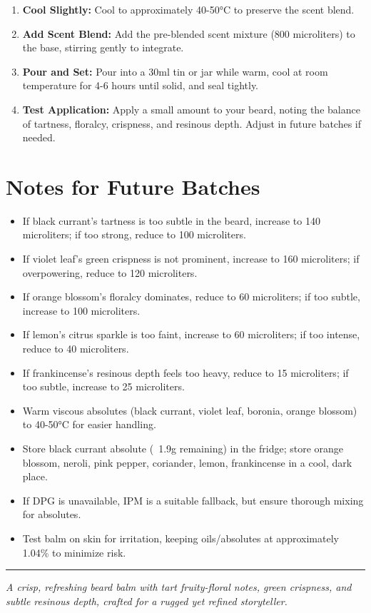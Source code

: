 \documentclass{article}
\begin{document}
\begin{enumerate}
  \item \textbf{Cool Slightly:} Cool to approximately 40-50°C to preserve the scent blend.
  \item \textbf{Add Scent Blend:} Add the pre-blended scent mixture (800 microliters) to the base, stirring gently to integrate.
  \item \textbf{Pour and Set:} Pour into a 30ml tin or jar while warm, cool at room temperature for 4-6 hours until solid, and seal tightly.
  \item \textbf{Test Application:} Apply a small amount to your beard, noting the balance of tartness, floralcy, crispness, and resinous depth. Adjust in future batches if needed.
\end{enumerate}

\section*{Notes for Future Batches}
\begin{itemize}
  \item If black currant’s tartness is too subtle in the beard, increase to 140 microliters; if too strong, reduce to 100 microliters.
  \item If violet leaf’s green crispness is not prominent, increase to 160 microliters; if overpowering, reduce to 120 microliters.
  \item If orange blossom’s floralcy dominates, reduce to 60 microliters; if too subtle, increase to 100 microliters.
  \item If lemon’s citrus sparkle is too faint, increase to 60 microliters; if too intense, reduce to 40 microliters.
  \item If frankincense’s resinous depth feels too heavy, reduce to 15 microliters; if too subtle, increase to 25 microliters.
  \item Warm viscous absolutes (black currant, violet leaf, boronia, orange blossom) to 40-50°C for easier handling.
  \item Store black currant absolute (~1.9g remaining) in the fridge; store orange blossom, neroli, pink pepper, coriander, lemon, frankincense in a cool, dark place.
  \item If DPG is unavailable, IPM is a suitable fallback, but ensure thorough mixing for absolutes.
  \item Test balm on skin for irritation, keeping oils/absolutes at approximately 1.04\% to minimize risk.
\end{itemize}

\vspace{1cm}
\begin{center}
\textcolor{violetPurple}{\rule{0.8\textwidth}{0.4pt}}
\end{center}

\begin{center}
\textit{\textcolor{colaDark}{A crisp, refreshing beard balm with tart fruity-floral notes, green crispness, and subtle resinous depth, crafted for a rugged yet refined storyteller.}}
\end{center}
\end{document}
